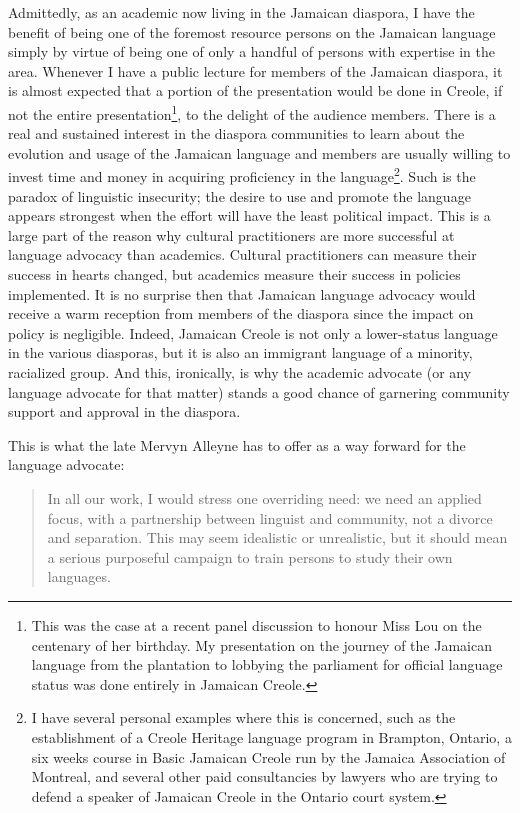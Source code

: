 \documentclass[output=paper,colorlinks,citecolor=brown]{langscibook}
\begin{document}
Admittedly, as an academic now living in the Jamaican diaspora, I have the benefit of being one of the foremost resource persons on the Jamaican language simply by virtue of being one of only a handful of persons with expertise in the area. Whenever I have a public lecture for members of the Jamaican diaspora, it is almost expected that a portion of the presentation would be done in Creole, if not the entire presentation\footnote{This was the case at a recent panel discussion to honour Miss Lou on the centenary of her birthday. My presentation on the journey of the Jamaican language from the plantation to lobbying the parliament for official language status was done entirely in Jamaican Creole.}, to the delight of the audience members. There is a real and sustained interest in the diaspora communities to learn about the evolution and usage of the Jamaican language and members are usually willing to invest time and money in acquiring proficiency in the language\footnote{I have several personal examples where this is concerned, such as the establishment of a Creole Heritage language program in Brampton, Ontario, a six weeks course in Basic Jamaican Creole run by the Jamaica Association of Montreal, and several other paid consultancies by lawyers who are trying to defend a speaker of Jamaican Creole in the Ontario court system.}. Such is the paradox of linguistic insecurity; the desire to use and promote the language appears strongest when the effort will have the least political impact. This is a large part of the reason why cultural practitioners are more successful at language advocacy than academics. Cultural practitioners can measure their success in hearts changed, but academics measure their success in policies implemented. It is no surprise then that Jamaican language advocacy would receive a warm reception from members of the diaspora since the impact on policy is negligible. Indeed, Jamaican Creole is not only a lower-status language in the various diasporas, but it is also an immigrant language of a minority, racialized group. And this, ironically, is why the academic advocate (or any language advocate for that matter) stands a good chance of garnering community support and approval in the diaspora. 

This is what the late Mervyn Alleyne has to offer as a way forward for the language advocate:

\begin{quote}
In all our work, I would stress one overriding need: we need an applied focus, with a partnership between linguist and community, not a divorce and separation. This may seem idealistic or unrealistic, but it should mean a serious purposeful campaign to train persons to study their own languages. \citep[13]{Alleyne2004}
\end{quote}
\end{document}
